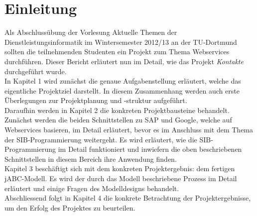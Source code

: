 \section{Einleitung}
Als Abschlussübung der Vorlesung Aktuelle Themen der Dienstleistungsinformatik im Wintersemester 2012/13 an der TU-Dortmund sollten die teilnehmenden Studenten ein Projekt zum Thema Webservices durchführen. Dieser Bericht erläutert nun im Detail, wie das Projekt \textit{Kontakte} durchgeführt wurde. \\

In Kapitel 1 wird zunächst die genaue Aufgabenstellung erläutert, welche das eigentliche Projektziel darstellt. In diesem Zusammenhang werden auch erste Überlegungen zur Projektplanung und -struktur aufgeführt.\\

Daraufhin werden in Kapitel 2 die konkreten Projektbausteine behandelt. Zunächst werden die beiden Schnittstellen zu SAP und Google, welche auf Webservices basieren, im Detail erläutert, bevor es im Anschluss mit dem Thema der SIB-Programmierung weitergeht. Es wird erläutert, wie die SIB-Programmierung im Detail funktioniert und inwiefern die oben beschriebenen Schnittstellen in diesem Bereich ihre Anwendung finden.\\

Kapitel 3 beschäftigt sich mit dem konkreten Projektergebnis: dem fertigen jABC-Modell. Es wird der durch das Modell beschriebene Prozess im Detail erläutert und einige Fragen des Modelldesigns behandelt.\\

Abschliessend folgt in Kapitel 4 die konkrete Betrachtung der Projektergebnisse, um den Erfolg des Projektes zu beurteilen. 


